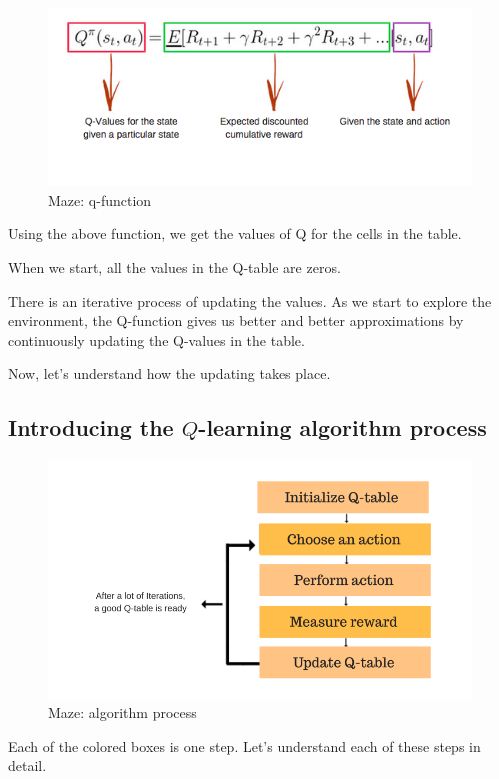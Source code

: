 \begin{figure}[!htb]
\centering
\includegraphics[scale=0.618]{pix/q_learning/q_function.png}
\caption{Maze: q-function}
\end{figure}

Using the above function, we get the values of Q for the cells in the table.

When we start, all the values in the Q-table are zeros.

There is an iterative process of updating the values. As we start to explore the 
environment, the Q-function gives us better and better approximations by continuously 
updating the Q-values in the table.

Now, let's understand how the updating takes place.


\subsection{Introducing the $Q$-learning algorithm process}

\begin{figure}[!htb]
\centering
\includegraphics[scale=0.4]{pix/q_learning/q_learning_algorithm_process.png}
\caption{Maze: algorithm process}
\end{figure}
Each of the colored boxes is one step. Let's understand each of these steps in detail.



